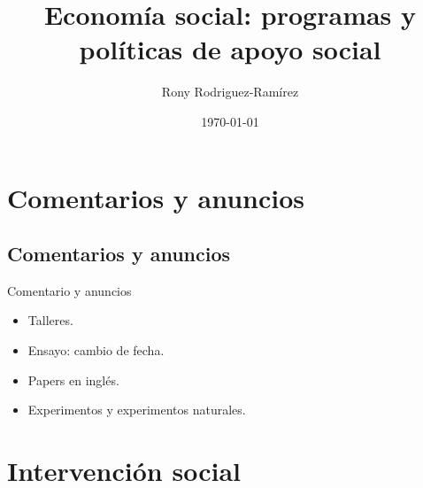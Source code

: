 \documentclass[11pt, aspectratio=169, compress]{beamer}
\title{Economía social: programas y políticas de apoyo social}
\author{Rony Rodriguez-Ramírez}
\institute{Economía Social y Humana | Grupo B018 \\Universidad Centroamericana}
\date{\today}
\begin{document}
	
\begin{frame}[plain]
	\maketitle  
\end{frame}

\section{Comentarios y anuncios}
\subsection{Comentarios y anuncios}
\begin{frame}[t]{Comentario y anuncios}
\begin{itemize}
	\item Talleres.  
	\item Ensayo: cambio de fecha. 
	\item Papers en inglés. 
	\item Experimentos y experimentos naturales. 
\end{itemize}
\end{frame}
\section{Intervención social}
\end{document}
